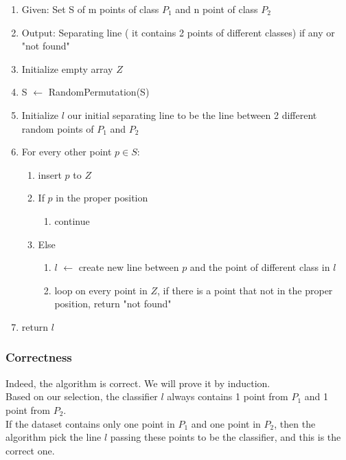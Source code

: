 \begin{enumerate}
\item Given: Set S of m points of class $P_1$ and n point of class $P_2$  
\item Output: Separating line ( it contains 2 points of different classes) if any or "not found"

\item Initialize empty array $Z$
\item S $\leftarrow$ RandomPermutation(S) 
\item Initialize $l$ our initial separating line to be the line between 2 different random points of $P_1$ and $P_2$
\item For every other point  $p  \in S$:
\begin{enumerate}
    \item insert $p$ to $Z$
\item If $p$ in the proper position
\begin{enumerate}
\item continue 
\end{enumerate}
\item Else  
   \begin{enumerate}
\item $l$  $\leftarrow$ create new line between $p$ and the point of different class in $l$ 
\item loop on every point in $Z$, if there is a point that not in the proper position, return "not found"

\end{enumerate}    
        
\end{enumerate}

\item return $l$
\end{enumerate}

\subsubsection*{Correctness}
Indeed, the algorithm is correct. We will prove it by induction. \\ 

Based on our selection, the classifier $l$ always contains 1 point from $P_1$ and 1 point from $P_2$. \\

If the dataset contains only one point in $P_1$ and one point in $P_2$, then the algorithm pick the line $l$ passing these points to be the classifier, and this is the correct one. \\


